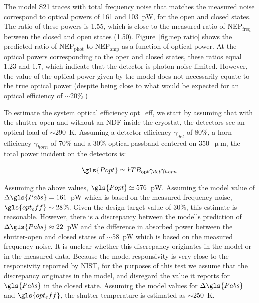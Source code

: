 The model \gls{S21} traces with total frequency noise that matches the measured noise correspond to optical powers of 161 and 103~pW, for the open and closed states. The ratio of these powers is 1.55, which is close to the measured ratio of NEP$_{\mathrm{freq}}$ between the closed and open states (1.50). Figure~\ref{fig:nep ratio} shows the predicted ratio of NEP$_{\mathrm{phot}}$ to NEP$_{\mathrm{amp}}$ as a function of optical power. At the optical powers corresponding to the open and closed states, these ratios equal 1.23 and 1.7, which indicate that the detector is photon-noise limited. However, the value of the optical power given by the model does not necessarily equate to the true optical power (despite being close to what would be expected for an optical efficiency of $\sim$20\%.)

To estimate the system optical efficiency \gls{opt_eff}, we start by assuming that with the shutter open and without an NDF inside the cryostat, the detectors see an optical load of $\sim$290~K. Assuming a detector efficiency $\gamma_{det}$ of 80\%, a horn efficiency $\gamma_{horn}$ of 70\% and a 30\% optical passband centered on 350~$\upmu$m, the total power incident on the detectors is:

\begin{equation}\label{eq:opt eff}
  \gls{Popt} \simeq k T B_{\mathrm{opt}} \gamma_{det} \gamma_{horn}
\end{equation}

Assuming the above values, $\gls{Popt} \simeq 576$~pW. Assuming the model value of $\Delta \gls{Pabs} = 161$~pW which is based on the measured frequency noise, $\gls{opt_eff} \sim 28$\%. Given the design target value of 30\%, this estimate is reasonable. However, there is a discrepancy between the model's prediction of $\Delta \gls{Pabs}\approx 22$~pW and the difference in absorbed power between the shutter-open and closed states of $\sim$58~pW which is based on the measured frequency noise. It is unclear whether this discrepancy originates in the model or in the measured data. Because the model responsivity is very close to the responsivity reported by NIST, for the purposes of this test we assume that the discrepancy originates in the model, and disregard the value it reports for $\gls{Pabs}$ in the closed state. Assuming the model values for $\Delta \gls{Pabs}$ and $\gls{opt_eff}$, the shutter temperature is estimated as $\sim$250~K.

